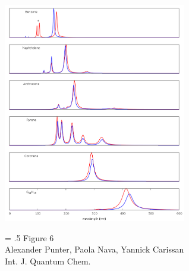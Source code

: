 \documentclass[12pt]{article}
\begin{document}
\clearpage

\begin{figure}

\begin{center}
\includegraphics[width=8cm]{grand_rpa_singlet}
\end{center}
{\Large
\begin{minipage}[t]{3in}
\baselineskip = .5\baselineskip
Figure 6 \\
Alexander Punter, Paola Nava, Yannick Carissan\\
Int. J. Quantum Chem.
\end{minipage}
}
\end{figure}

\clearpage
\end{document}
